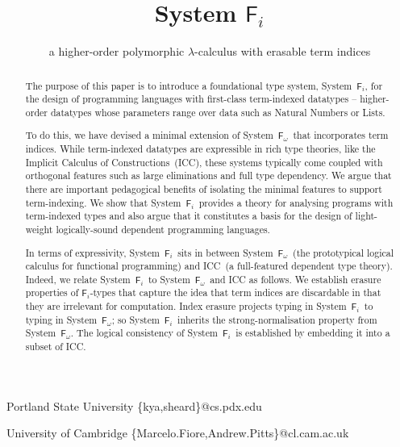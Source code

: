 \documentclass[preprint]{sigplanconf}
\newcommand{\Fi}{\ensuremath{\mathsf{F}_i}}
\newcommand{\Fw}{\ensuremath{\mathsf{F}_\omega}}
\theoremstyle{plain}
\theoremstyle{remark}
\theoremstyle{definition}
\begin{document}
\copyrightdata{[to be supplied]} 


\title{System \Fi}
\subtitle{a higher-order polymorphic $\lambda$-calculus with erasable term indices}

           {Portland State University}
	   {\{kya,sheard\}@cs.pdx.edu}

           {University of Cambridge}
	   {\{Marcelo.Fiore,Andrew.Pitts\}@cl.cam.ac.uk}

\maketitle

\begin{abstract}
The purpose of this paper is to introduce a foundational type system,
System~\Fi, for the design of programming languages with first-class
term-indexed datatypes -- higher-order datatypes whose parameters range
over data such as 
Natural Numbers %
or 
Lists. %

To do this, we have
devised a minimal extension of System~\Fw\ that incorporates term indices.
While term-indexed datatypes are expressible in rich type theories, like
the Implicit Calculus of Constructions~(ICC), these systems typically come 
coupled with
orthogonal features such as large eliminations and full type dependency.  We
argue that there are important pedagogical benefits of isolating the
minimal features to support term-indexing. We show that System~\Fi\
provides a theory for analysing programs with term-indexed types and also
argue that it constitutes a basis for the design of light-weight
logically-sound dependent programming languages.

In terms of expressivity, System~\Fi\ sits in between System~\Fw\ (the
prototypical logical calculus for functional programming) and ICC~(a
full-featured dependent type theory).  Indeed, we relate System~\Fi\ to
System~\Fw\ and ICC as follows.  We establish erasure properties of
\Fi-types that capture the idea that term indices are discardable in
that they are irrelevant for computation.  Index erasure projects typing
in System~\Fi\ to typing in System~\Fw; so System~\Fi\ inherits the
strong-normalisation property from System~\Fw.  The logical consistency of
System~\Fi\ is established by embedding it into a subset of ICC.
\end{abstract}
\end{document}
